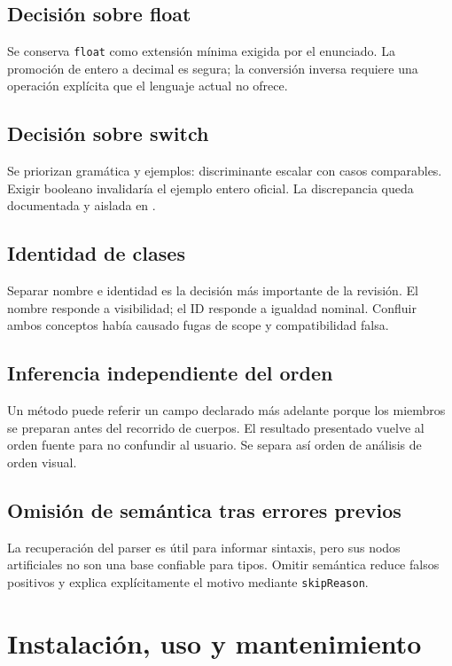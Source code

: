\documentclass[11pt,letterpaper,oneside]{report}
\newcommand{\archivo}[1]{\path{#1}}
\newcommand{\codigo}[1]{\texttt{#1}}
\begin{document}
\section{Decisión sobre float}

Se conserva \codigo{float} como extensión mínima exigida por el enunciado. La
promoción de entero a decimal es segura; la conversión inversa requiere una operación
explícita que el lenguaje actual no ofrece.

\section{Decisión sobre switch}

Se priorizan gramática y ejemplos: discriminante escalar con casos comparables. Exigir
booleano invalidaría el ejemplo entero oficial. La discrepancia queda documentada y
aislada en \archivo{DECISIONES\_SEMANTICAS.md}.

\section{Identidad de clases}

Separar nombre e identidad es la decisión más importante de la revisión. El nombre
responde a visibilidad; el ID responde a igualdad nominal. Confluir ambos conceptos
había causado fugas de scope y compatibilidad falsa.

\section{Inferencia independiente del orden}

Un método puede referir un campo declarado más adelante porque los miembros se
preparan antes del recorrido de cuerpos. El resultado presentado vuelve al orden
fuente para no confundir al usuario. Se separa así orden de análisis de orden visual.

\section{Omisión de semántica tras errores previos}

La recuperación del parser es útil para informar sintaxis, pero sus nodos artificiales
no son una base confiable para tipos. Omitir semántica reduce falsos positivos y
explica explícitamente el motivo mediante \codigo{skipReason}.

\chapter{Instalación, uso y mantenimiento}
\end{document}
